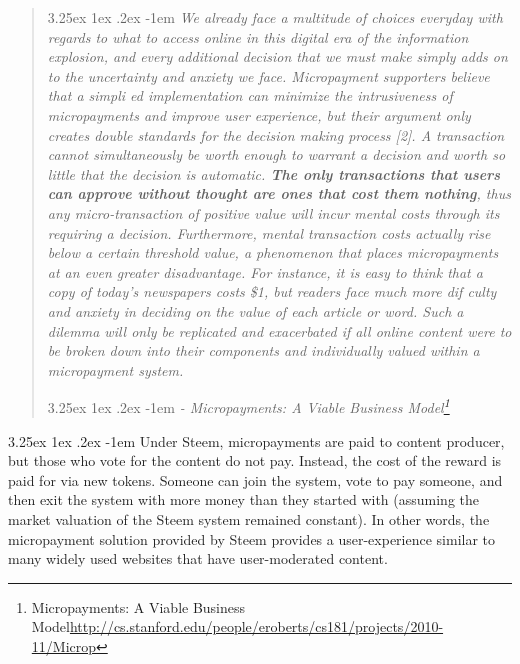 \documentclass{article}
\makeatletter
\renewcommand\paragraph{\@startsection{paragraph}{5}{\z@}%
  {3.25ex \@plus1ex \@minus.2ex}%
  {-1em}%
  {\normalfont\normalsize\bfseries}}
\makeatother
\begin{document}
			\begin{quote}

				\paragraph{}
					\textit{We already face a multitude of choices everyday with regards to what to access online in this digital era of the information explosion, and every additional decision that we must make simply adds on to the uncertainty and anxiety we face. Micropayment supporters believe that a simpli ed implementation can minimize the intrusiveness of micropayments and improve user experience, but their argument only creates double standards for the decision making process [2]. A transaction cannot simultaneously be worth enough to warrant a decision and worth so little that the decision is automatic. \textbf{The only transactions that users can approve without thought are ones that cost them nothing}, thus any micro-transaction of positive value will incur mental costs through its requiring a decision. Furthermore, mental transaction costs actually rise below a certain threshold value, a phenomenon that places micropayments at an even greater disadvantage. For instance, it is easy to think that a copy of today's newspapers costs \$1, but readers face much more dif culty and anxiety in deciding on the value of each article or word. Such a dilemma will only be replicated and exacerbated if all online content were to be broken down into their components and individually valued within a micropayment system.}

				\paragraph{}
					\textit{- Micropayments: A Viable Business Model\footnote{Micropayments: A Viable Business Model\newline\url{http://cs.stanford.edu/people/eroberts/cs181/projects/2010-11/Microp}}}

			\end{quote}

			\paragraph{}
				Under Steem, micropayments are paid to content producer, but those who vote for the content do not pay. Instead, the cost of the reward is paid for via new tokens. Someone can join the system, vote to pay someone, and then exit the system with more money than they started with (assuming the market valuation of the Steem system remained constant). In other words, the micropayment solution provided by Steem provides a user-experience similar to many widely used websites that have user-moderated content.
\end{document}
